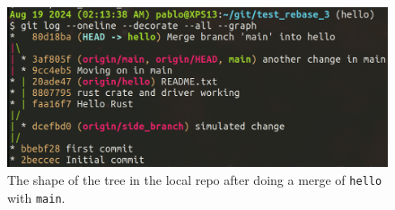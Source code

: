 \documentclass[10pt]{article}
\newcommand{\ket}[1]{$\left|#1\right\rangle$}
\newcommand{\Om}[1]{\small $\omega_{#1}$}
\newcommand{\De}[1]{$\Delta_{#1}$}
\newcommand{\Ga}[1]{$\Gamma_{#1}$}
\begin{document}
\begin{figure}[ht!]
    \centering
    \includegraphics[width=\textwidth]{images/Tree_after_merge_main_on_hello.png}
    \caption{The shape of the tree in the local repo after doing a merge of \texttt{hello} with \texttt{main}.}
    \label{fig:tree-after-merge}
\end{figure}









\end{document}
